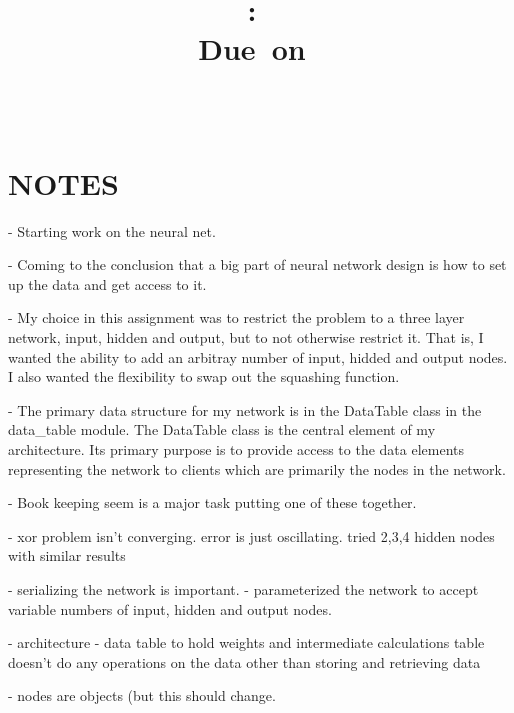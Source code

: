 \documentclass{article}
\title{\vspace{2in}\textmd{\textbf{\hmwkClass:\ \hmwkTitle\ifthenelse{\equal{\hmwkSubTitle}{}}{}{\\\hmwkSubTitle}}}\\\normalsize\vspace{0.1in}\small{Due\ on\ \hmwkDueDate}\\\vspace{0.1in}\large{\textit{\hmwkClassInstructor\ \hmwkClassTime}}\vspace{3in}}
\date{}
\author{\textbf{\hmwkAuthorName}}
\begin{document}
\maketitle

\section{NOTES}
- Starting work on the neural net.

- Coming to the conclusion that a big part of neural network
design is how to set up the data and get access to it.

- My choice in this assignment was to restrict the problem to a
three layer network, input, hidden and output, but to not
otherwise restrict it.  That is, I wanted the ability to add
an arbitray number of input, hidded and output nodes.  I also
wanted the flexibility to swap out the squashing function.

- The primary data structure for my network is in the DataTable
class in the data_table module.  The DataTable class is the central
element of my architecture.  Its primary purpose is to provide
access to the data elements representing the network to clients
which are primarily the nodes in the network.

- Book keeping seem is a major task putting one of these together.

- xor problem isn't converging.  error is just oscillating.  tried
2,3,4 hidden nodes with similar results

- serializing the network is important.
- parameterized the network to accept variable numbers of input,
hidden and output nodes.

- architecture
  - data table to hold weights and intermediate calculations
  table doesn't do any operations on the data other than storing and
  retrieving data

- nodes are objects (but this should change.
\end{document}
